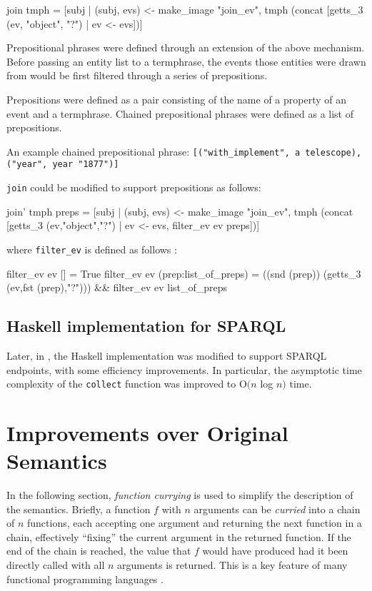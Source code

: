 \documentclass[../main.tex]{subfiles}
\begin{document}
\begin{code}
  join tmph = [subj | (subj, evs) <- make_image "join_ev",
       tmph (concat [getts_3 (ev,  "object", "?") | ev <- evs])]
\end{code}

Prepositional phrases were defined through an extension of the above
mechanism.  Before passing an entity list to a termphrase, the events
those entities were drawn from would be first filtered through a series
of prepositions.

Prepositions were defined as a pair consisting of the name of a property
of an event and a termphrase.  Chained prepositional phrases were defined
as a list of prepositions.

An example chained prepositional phrase: \texttt{[("with\_implement", a
telescope), ("year", year "1877")]}

\texttt{join} could be modified to support prepositions as follows:

\begin{code}
  join’ tmph preps = [subj | (subj, evs) <- make_image "join_ev", 
    tmph (concat [getts_3 (ev,"object","?") | ev <- evs,
      filter_ev ev preps])]
\end{code}

where \texttt{filter\_ev} is defined as follows \cite{frost2014denotational}:

\begin{code}
  filter_ev ev [] = True
  filter_ev ev (prep:list_of_preps)
    = ((snd (prep)) (getts_3 (ev,fst (prep),"?")))
        && filter_ev ev list_of_preps
\end{code}

\subsection{Haskell implementation for SPARQL}

Later, in \cite{agboola2015extensible}, the Haskell implementation was modified
to support SPARQL endpoints, with some efficiency improvements.  In particular, the asymptotic time complexity of the \texttt{collect} function was improved to O$(n$ log $n)$ time.

\section{Improvements over Original Semantics}

In the following section, {\em function currying} \cite{currying} is used to simplify the description of the semantics.
Briefly, a function $f$ with $n$ arguments can be {\em curried} into a chain of $n$ functions, each accepting one argument and returning the next function
in a chain, effectively ``fixing'' the current argument in the returned function.  If the end of the chain is reached, the value that $f$
would have produced had it been directly called with all $n$ arguments is returned.  This is a key feature of many functional programming languages \cite{haskell}.
\end{document}
